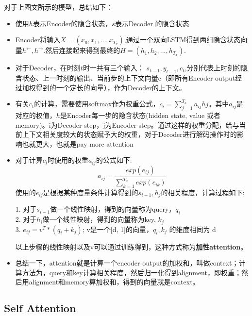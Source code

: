 \documentclass[UTF8,a4paper,10pt]{ctexart}
\begin{document}
      对于上图文所示的模型，总结如下：
      \begin{itemize}
        \item  使用$h$表示Encoder的隐含状态，$s​$表示Decoder 的隐含状态
         
        \item Encoder将输入$X = (x_0, x_1, ...,x_{T_x})$,通过一个双向LSTM得到两组隐含状态向量$h^{\leftarrow}, h^{\rightarrow}$.然后连接起来得到最终的$H=(h_1,h_2, ...,h_{T_x})$.

        \item 对于Decoder，在时刻$t$时一共有三个输入： $s_{t-1}, y_{t-1}, c_t$,分别代表上时刻的隐含状态、上一时刻的输出、当前步的上下文向量c（即所有Encoder output经过加权得到的一个定长的向量），作为Decoder的上下文。

        \item 有关$c_t$的计算，需要使用softmax作为权重公式，$c_i = \sum_{j=1}^{T_x}a_{ij}h{j}$。其中$a_{ij}$是对应的权值，$h$是Encoder每一步的隐含状态(hidden state, value 或者memory)。i为Decoder step，j为Encoder step。通过这样的权重分配，给与当前上下文相关度较大的状态赋予大的权重，对于Decoder进行解码操作时的影响也就更大，也就是pay more attention

        \item 对于计算$c_i$时使用的权重$a_{ij}$的公式如下:
  $$
              a_{ij} = \frac{exp(e_{ij})}{\sum_{k=1}^{T_x}{exp(e_{ik})}}
  $$
            使用的$e_{ij}$是根据某种度量条件计算得到的$s_{i-1},h_j$的相关程度，计算过程如下:
            \begin{tcolorbox}
               1. 对于$s_{i-1}$做一个线性映射，得到的向量称为query，$q_i$
               \\ 2. 对于$h_i$做一个线性映射，得到的向量称为key, $k_j$
               \\ 3. $e_{ij} = v^T * (q_i + k_j)$; v是一个[d, 1]的向量，$q_i, k_j$ 的维度相同为 d
              \end{tcolorbox}
              以上步骤的线性映射以及v可以通过训练得到，这种方式称为\textbf{加性attention}。

          \item 总结一下，attention就是计算一个encoder output的加权和，叫做context；计算方法为，query和key计算相关程度，然后归一化得到alignment，即权重；然后用alignment和memory算加权和，得到的向量就是context。
      \end{itemize}

    \subsection{\textbf{Self Attention}}
\end{document}
